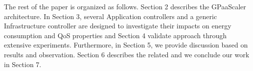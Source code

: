 The rest of the paper is organized as follows. 
Section 2 describes the GPaaScaler architecture. In Section 3,
several Application controllers and a generic Infrastructure controller are designed to investigate
their impacts on energy consumption and QoS properties
and Section 4 validate approach through extensive experiments.
Furthermore, in Section 5, we provide discussion based on results and observation. Section 6 describes the related and we conclude our work in Section 7.